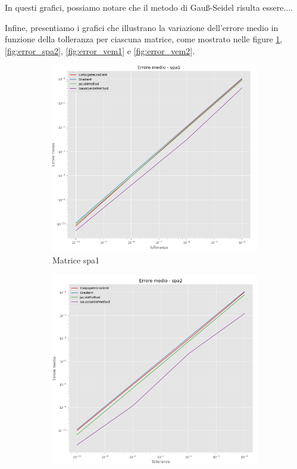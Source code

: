 In questi grafici, possiamo notare che il metodo di Gauß-Seidel risulta essere....


Infine, presentiamo i grafici che illustrano la variazione dell'errore medio in
funzione della tolleranza per ciascuna matrice, come mostrato nelle figure \ref{fig:error_spa1},
\ref{fig:error_spa2}, \ref{fig:error_vem1} e \ref{fig:error_vem2}.

\begin{figure}[!ht]
    \centering
    \begin{subfigure}{0.45\textwidth}
        \centering
        \includegraphics[width=\textwidth]{./img/error_spa1.png}
        \caption{Matrice spa1}
        \label{fig:error_spa1}
    \end{subfigure}
    \begin{subfigure}{0.45\textwidth}
        \centering
        \includegraphics[width=\textwidth]{./img/error_spa2.png}

\end{subfigure}
\end{figure}

